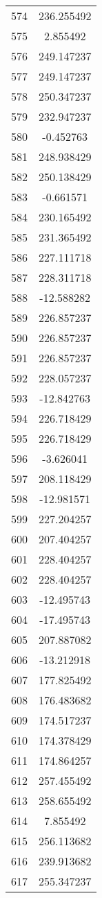\documentclass[12pt]{article}
\begin{document}
\begin{longtable}{@{}cc@{}}
574 & 236.255492 \\
575 & 2.855492 \\
576 & 249.147237 \\
577 & 249.147237 \\
578 & 250.347237 \\
579 & 232.947237 \\
580 & -0.452763 \\
581 & 248.938429 \\
582 & 250.138429 \\
583 & -0.661571 \\
584 & 230.165492 \\
585 & 231.365492 \\
586 & 227.111718 \\
587 & 228.311718 \\
588 & -12.588282 \\
589 & 226.857237 \\
590 & 226.857237 \\
591 & 226.857237 \\
592 & 228.057237 \\
593 & -12.842763 \\
594 & 226.718429 \\
595 & 226.718429 \\
596 & -3.626041 \\
597 & 208.118429 \\
598 & -12.981571 \\
599 & 227.204257 \\
600 & 207.404257 \\
601 & 228.404257 \\
602 & 228.404257 \\
603 & -12.495743 \\
604 & -17.495743 \\
605 & 207.887082 \\
606 & -13.212918 \\
607 & 177.825492 \\
608 & 176.483682 \\
609 & 174.517237 \\
610 & 174.378429 \\
611 & 174.864257 \\
612 & 257.455492 \\
613 & 258.655492 \\
614 & 7.855492 \\
615 & 256.113682 \\
616 & 239.913682 \\
617 & 255.347237 \\

\end{longtable}
\end{document}
